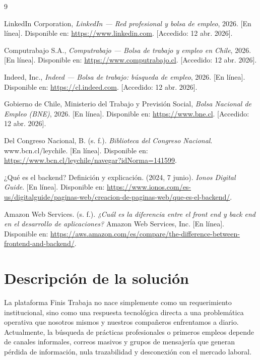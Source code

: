 \documentclass[11pt,a4paper]{Plantilla}
\begin{document}
\begin{thebibliography}{9}

LinkedIn Corporation,
\textit{LinkedIn --- Red profesional y bolsa de empleo},
2026.
[En línea]. Disponible en: \url{https://www.linkedin.com}.
[Accedido: 12 abr. 2026].

Computrabajo S.A.,
\textit{Computrabajo --- Bolsa de trabajo y empleo en Chile},
2026.
[En línea]. Disponible en: \url{https://www.computrabajo.cl}.
[Accedido: 12 abr. 2026].


Indeed, Inc.,
\textit{Indeed --- Bolsa de trabajo: búsqueda de empleo},
2026.
[En línea]. Disponible en: \url{https://cl.indeed.com}.
[Accedido: 12 abr. 2026].

Gobierno de Chile, Ministerio del Trabajo y Previsión Social,
\textit{Bolsa Nacional de Empleo (BNE)},
2026.
[En línea]. Disponible en: \url{https://www.bne.cl}.
[Accedido: 12 abr. 2026].

Del Congreso Nacional, B. (s. f.).
\textit{Biblioteca del Congreso Nacional}.
www.bcn.cl/leychile.
[En línea]. Disponible en: \url{https://www.bcn.cl/leychile/navegar?idNorma=141599}.

¿Qué es el backend? Definición y explicación. (2024, 7 junio).
\textit{Ionos Digital Guide}.
[En línea]. Disponible en: \url{https://www.ionos.com/es-us/digitalguide/paginas-web/creacion-de-paginas-web/que-es-el-backend/}.

Amazon Web Services. (s. f.).
\textit{¿Cuál es la diferencia entre el front end y back end en el desarrollo de aplicaciones?}
Amazon Web Services, Inc.
[En línea]. Disponible en: \url{https://aws.amazon.com/es/compare/the-difference-between-frontend-and-backend/}.



\end{thebibliography}


\section{Descripción de la solución}%

La plataforma Finis Trabaja no nace simplemente como un requerimiento institucional, sino como una respuesta tecnológica directa a una problemática operativa que nosotros mismos y nuestros compañeros enfrentamos a diario. Actualmente, la búsqueda de prácticas profesionales o primeros empleos depende de canales informales, correos masivos y grupos de mensajería que generan pérdida de información, nula trazabilidad y desconexión con el mercado laboral. 
\end{document}

